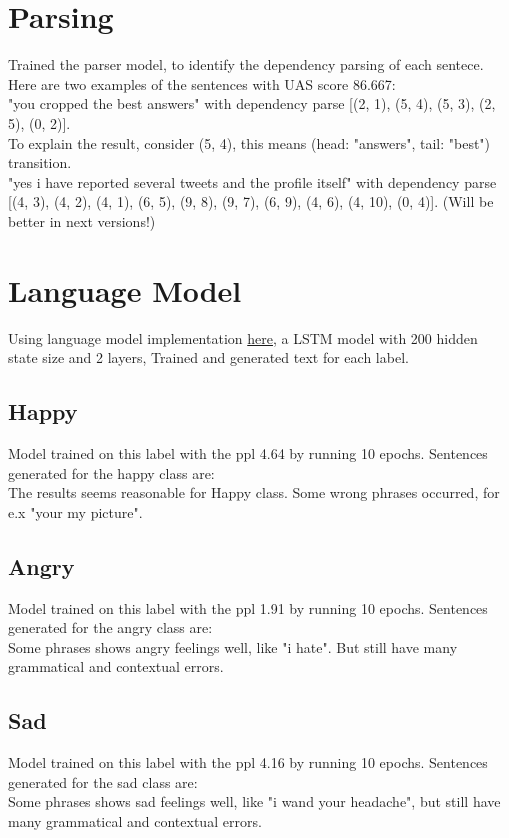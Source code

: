 \documentclass[a4paper]{article}
\begin{document}
\section{Parsing}
Trained the parser model, to identify the dependency parsing of each sentece. Here are two examples of the sentences with UAS score 86.667:\\
"you cropped the best answers" with dependency parse [(2, 1), (5, 4), (5, 3), (2, 5), (0, 2)].\\ 
To explain the result, consider (5, 4), this means (head: "answers", tail: "best") transition.\\
"yes i have reported several tweets and the profile itself" with dependency parse [(4, 3), (4, 2), (4, 1), (6, 5), (9, 8), (9, 7), (6, 9), (4, 6), (4, 10), (0, 4)]. (Will be better in next versions!)
\section{Language Model}
Using language model implementation \href{https://github.com/pytorch/examples}{here}, a LSTM model with 200 hidden state size and 2 layers, Trained and generated text for each label.
\subsection{Happy}
Model trained on this label with the ppl 4.64 by running 10 epochs. Sentences generated for the happy class are:\\

The results seems reasonable for Happy class. Some wrong phrases occurred, for e.x "your my picture".\\
\subsection{Angry}
Model trained on this label with the ppl 1.91 by running 10 epochs. Sentences generated for the angry class are:\\

Some phrases shows angry feelings well, like "i hate". But still have many grammatical and contextual errors.\\
\subsection{Sad}
Model trained on this label with the ppl 4.16 by running 10 epochs. Sentences generated for the sad class are:\\

Some phrases shows sad feelings well, like "i wand your headache", but still have many grammatical and contextual errors.\\
\end{document}
